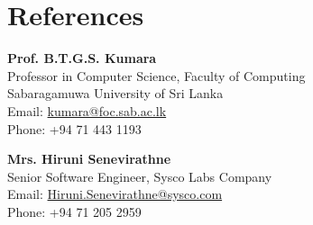 \documentclass[letterpaper,12pt]{article}
\begin{document}
\section{References}
\vspace{-1pt}

\textbf{Prof. B.T.G.S. Kumara}\\
Professor in Computer Science, Faculty of Computing\\
Sabaragamuwa University of Sri Lanka\\
Email: \href{mailto:kumara@foc.sab.ac.lk}{kumara@foc.sab.ac.lk}\\
Phone: +94 71 443 1193

\vspace{6pt}
\noindent\textbf{Mrs. Hiruni Senevirathne}\\
Senior Software Engineer, Sysco Labs Company\\
Email: \href{mailto:Hiruni.Senevirathne@sysco.com}{Hiruni.Senevirathne@sysco.com}\\
Phone: +94 71 205 2959
\end{document}
